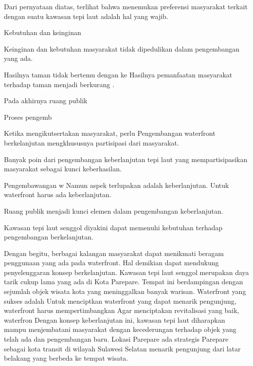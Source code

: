 \documentclass[../projects/thesis.tex]{subfiles}
\begin{document}
Dari pernyataan diatas, terlihat bahwa menemukan preferensi masyarakat terkait dengan suatu kawasan tepi laut adalah hal yang wajib.

\cite{giovinazzi2009}

Kebutuhan dan keinginan


Keinginan dan kebutuhan masyarakat tidak dipedulikan dalam pengembangan yang ada.

Hasilnya taman tidak bertemu dengan ke
Hasilnya pemanfaatan masyarakat terhadap taman menjadi berkurang \citep{devysandra2012}.



Pada akhirnya ruang publik



Proses pengemb


Ketika mengikutsertakan masyarakat, perlu
Pengembangan waterfront berkelanjutan mengkhususnya partisipasi dari masyarakat.

Banyak poin dari pengembangan keberlanjutan tepi laut yang mempartisipasikan masyarakat sebagai kunci keberhasilan.








Pengembawangan w
Namun aspek terlupakan adalah keberlanjutan.
Untuk waterfront harus ada keberlanjutan.

Ruang publik menjadi kunci elemen dalam pengembangan keberlanjutan.

Kawasan tepi laut senggol diyakini dapat memenuhi kebutuhan terhadap pengembangan berkelanjutan.



Dengan begitu, berbagai kalangan masyarakat dapat menikmati beragam penggunaan yang ada pada waterfront.
Hal demikian dapat mendukung penyelenggaran konsep berkelanjutan.
Kawasan tepi laut senggol merupakan daya tarik cukup lama yang ada di Kota Parepare.
Tempat ini berdampingan dengan sejumlah objek wisata kota yang meninggalkan banyak warisan. Waterfront yang sukses adalah
Untuk menciptkan waterfront yang dapat menarik pengunjung, waterfront harus mempertimbangkan
Agar menciptakan revitalisasi yang baik, waterfron
Dengan konsep keberlanjutan ini, kawasan tepi laut diharapkan mampu menjembatani masyarakat dengan kecederungan terhadap objek yang telah ada dan pengembangan baru.
Lokasi Parepare ada
strategis
Parepare sebagai kota transit di wilayah Sulawesi Selatan menarik pengunjung dari latar belakang yang berbeda ke tempat wisata.
\end{document}
